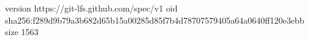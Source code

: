 version https://git-lfs.github.com/spec/v1
oid sha256:f289d9b79a3b682d65b15a00285d85f7b4d78707579405a64a0640ff120e3ebb
size 1563
